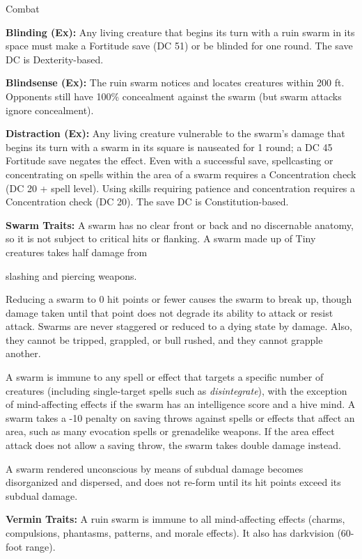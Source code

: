 \documentclass{article}
\begin{document}
{Combat

\textbf{Blinding (Ex): }Any living creature that begins its turn with a ruin swarm 
in its space must make a Fortitude save (DC 51) or be blinded for one round. The 
save DC is Dexterity-based.

\textbf{Blindsense (Ex): }The ruin swarm notices and locates creatures within 200 
ft. Opponents still have 100\% concealment against the swarm (but swarm attacks 
ignore concealment).

\textbf{Distraction (Ex): }Any living creature vulnerable to the swarm's damage 
that begins its turn with a swarm in its square is nauseated for 1 round; a DC 
45 Fortitude save negates the effect. Even with a successful save, spellcasting 
or concentrating on spells within the area of a swarm requires a Concentration 
check (DC 20 + spell level). Using skills requiring patience and concentration 
requires a Concentration check (DC 20). The save DC is Constitution-based.

\textbf{Swarm Traits: }A swarm has no clear front or back and no discernable anatomy, 
so it is not subject to critical hits or flanking. A swarm made up of Tiny creatures 
takes half damage from

slashing and piercing weapons.

Reducing a swarm to 0 hit points or fewer causes the swarm to break up, though 
damage taken until that point does not degrade its ability to attack or resist 
attack. Swarms are never staggered or reduced to a dying state by damage. Also, 
they cannot be tripped, grappled, or bull rushed, and they cannot grapple another.

A swarm is immune to any spell or effect that targets a specific number of creatures 
(including single-target spells such as \textit{disintegrate}), with the exception 
of mind-affecting effects if the swarm has an intelligence score and a hive mind. 
A swarm takes a -10 penalty on saving throws against spells or effects that affect 
an area, such as many evocation spells or grenadelike weapons. If the area effect 
attack does not allow a saving throw, the swarm takes double damage instead.

A swarm rendered unconscious by means of subdual damage becomes disorganized and 
dispersed, and does not re-form until its hit points exceed its subdual damage.

\textbf{Vermin Traits: }A ruin swarm is immune to all mind-affecting effects (charms, 
compulsions, phantasms, patterns, and morale effects). It also has darkvision (60-foot 
range).

}
\end{document}

